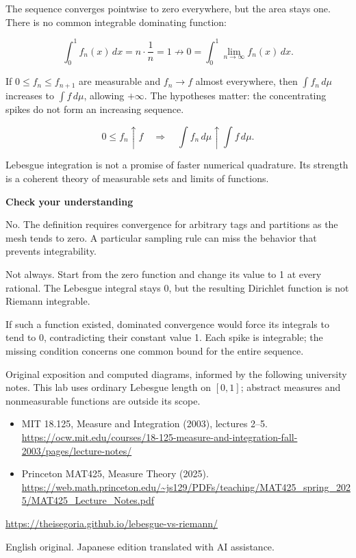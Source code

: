 \documentclass[11pt,a4paper]{article}
\newcommand{\topic}[1]{\vspace{6pt}{\large\bfseries #1}\par}
\newcommand{\pagetitle}[1]{{\LARGE\bfseries #1}\par\vspace{9pt}}
\begin{document}
\topic{$f_n(x)=n\,\mathbf1_{(0,1/n)}(x)$}

The sequence converges pointwise to zero everywhere, but the area stays one. There is no common integrable dominating function:

\[\int_0^1 f_n(x)\,dx=n\cdot\frac1n=1\not\longrightarrow0=\int_0^1\lim_{n\to\infty}f_n(x)\,dx.\]

\topic{Monotone convergence}

If \(0\le f_n\le f_{n+1}\) are measurable and \(f_n\to f\) almost everywhere, then \(\int f_n\,d\mu\) increases to \(\int f\,d\mu\), allowing \(+\infty\). The hypotheses matter: the concentrating spikes do not form an increasing sequence.

\[0\le f_n\uparrow f\quad\Longrightarrow\quad\int f_n\,d\mu\uparrow\int f\,d\mu.\]

Lebesgue integration is not a promise of faster numerical quadrature. Its strength is a coherent theory of measurable sets and limits of functions.

\newpage

\pagetitle{Check your understanding}

\topic{1. Does convergence of midpoint sums prove Riemann integrability?}

No. The definition requires convergence for arbitrary tags and partitions as the mesh tends to zero. A particular sampling rule can miss the behavior that prevents integrability.

\topic{2. Does changing a function on a null set preserve Riemann integrability?}

Not always. Start from the zero function and change its value to 1 at every rational. The Lebesgue integral stays 0, but the resulting Dirichlet function is not Riemann integrable.

\topic{3. Why does the spike have no integrable dominating function?}

If such a function existed, dominated convergence would force its integrals to tend to 0, contradicting their constant value 1. Each spike is integrable; the missing condition concerns one common bound for the entire sequence.

\topic{Sources and scope}

Original exposition and computed diagrams, informed by the following university notes. This lab uses ordinary Lebesgue length on \([0,1]\); abstract measures and nonmeasurable functions are outside its scope.

\begin{itemize}\item MIT 18.125, Measure and Integration (2003), lectures 2--5. \url{https://ocw.mit.edu/courses/18-125-measure-and-integration-fall-2003/pages/lecture-notes/}\item Princeton MAT425, Measure Theory (2025). \url{https://web.math.princeton.edu/~js129/PDFs/teaching/MAT425_spring_2025/MAT425_Lecture_Notes.pdf}\end{itemize}

\url{https://theisegoria.github.io/lebesgue-vs-riemann/}

English original. Japanese edition translated with AI assistance.
\end{document}
